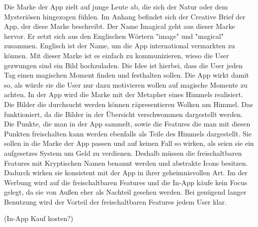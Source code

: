 Die Marke der App zielt auf junge Leute ab, die sich der Natur oder dem Mysteriösen hingezogen fühlen. Im Anhang befindet sich der Creative Brief der App, der diese Marke beschreibt.
Der Name Imagical geht aus dieser Marke hervor. Er setzt sich aus den Englischen Wörtern "image" und "magical" zusammen. Englisch ist der Name, um die App international vermarkten zu können.
Mit dieser Marke ist es einfach zu kommunizieren, wieso die User gezwungen sind ein Bild hochzuladen. Die Idee ist hierbei, dass die User jeden Tag einen magischen Moment finden und festhalten sollen. Die App wirkt damit so, als würde sie die User nur dazu motivieren wollen auf magische Momente zu achten.
In der App wird die Marke mit der Metapher eines Himmels realisiert. Die Bilder die durchsucht werden können räpresentieren Wolken am Himmel. Das funktioniert, da die Bilder in der Übersicht verschwommen dargestellt werden. Die Punkte, die man in der App sammelt, sowie die Features die man mit diesen Punkten freischalten kann werden ebenfalls als Teile des Himmels dargestellt. Sie sollen in die Marke der App passen und auf keinen Fall so wirken, als seien sie ein aufgesetzes System um Geld zu verdienen. Deshalb müssen die freischaltbaren Features mit Kryptischen Namen benannt werden und abstrakte Icons besitzen. Dadurch wirken sie konsistent mit der App in ihrer geheimnisvollen Art.
Im der Werbung wird auf die freischaltbaren Features und die In-App käufe kein Focus gelegt, da sie von Außen eher als Nachteil gesehen werden. Bei genügend langer Benutzung wird der Vorteil der freischaltbaren Features jedem User klar.

(In-App Kauf kosten?)

